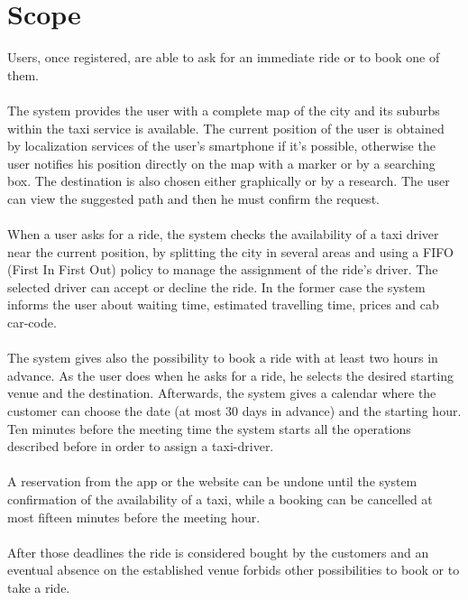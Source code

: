 \documentclass[\mainpath/main]{subfiles}
\begin{document}
\section{Scope}
Users, once registered, are able to ask for an immediate ride or to book one of them.\\
\\
The system provides the user with a complete map of the city and its suburbs within the taxi service is available. The current position of the user is obtained by localization services of the user's smartphone if it's possible, otherwise the user notifies his position directly on the map with a marker or by a searching box. The destination is also chosen either graphically or by a research. The user can view the suggested path and then he must confirm the request.\\
\\
When a user asks for a ride, the system checks the availability of a taxi driver near the current position, by splitting the city in several areas and using a FIFO (First In First Out) policy to manage the assignment of the ride's driver. The selected driver can accept or decline the ride. In the former case the system informs the user about waiting time, estimated travelling time, prices and cab car-code. \\
\\
The system gives also the possibility to book a ride with at least two hours in advance. As the user does when he asks for a ride, he selects the desired starting venue and the destination. Afterwards, the system gives a calendar where the customer can choose the date (at most 30 days in advance) and the starting hour. Ten minutes before the meeting time the system starts all the operations described before in order to assign a taxi-driver.\\
\\
A reservation from the app or the website can be undone until the system confirmation of the availability of a taxi, while a booking can be cancelled at most fifteen minutes before the meeting hour.\\
\\
After those deadlines the ride is considered bought by the customers and an eventual absence on the established venue forbids other possibilities to book or to take a ride.

\glsaddall
\printglossary[title={Definitions, Acronyms, Abbreviations}, toctitle={Definitions, Acronyms, Abbreviations}]
\end{document}
